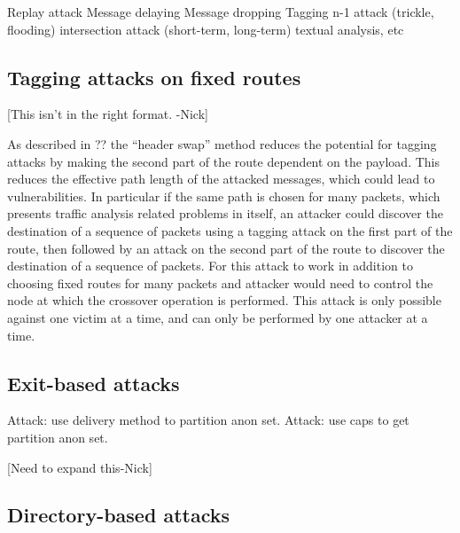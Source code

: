 \documentclass{llncs}
\begin{document}
{%
Replay attack
Message delaying
Message dropping
Tagging
n-1 attack (trickle, flooding)
intersection attack (short-term, long-term)
textual analysis, etc

\subsection{Tagging attacks on fixed routes}
[This isn't in the right format. -Nick]

As described in ?? the ``header swap'' method reduces the potential
for tagging attacks by making the second part of the route dependent
on the payload. This reduces the effective path length of the attacked
messages, which could lead to vulnerabilities. In particular if the
same path is chosen for many packets, which presents traffic analysis
related problems in itself, an attacker could discover the destination
of a sequence of packets using a tagging attack on the first part of
the route, then followed by an attack on the second part of the route
to discover the destination of a sequence of packets. For this attack to
work in addition to choosing fixed routes for many packets and attacker
would need to control the node at which the crossover operation is
performed. This attack is only possible against one victim at a time,
and can only be performed by one attacker at a time.


\subsection{Exit-based attacks}
\label{subsec:mix-attacks}
Attack: use delivery method to partition anon set.
Attack: use caps to get partition anon set.

[Need to expand this-Nick]

\subsection{Directory-based attacks}
\label{subsec:attacks-dirbased}

}
\end{document}
